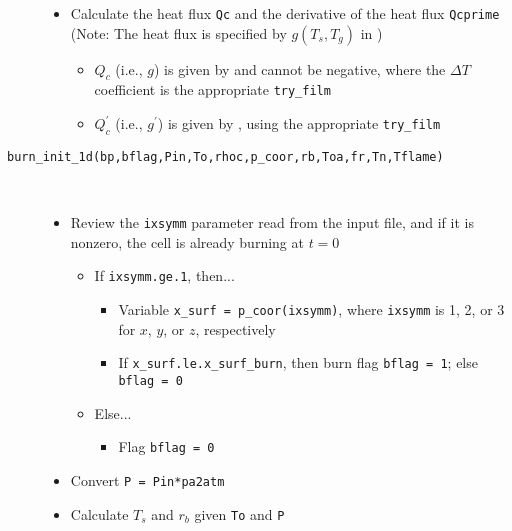 \begin{description}
{\begin{itemize}
\item{Calculate the heat flux \texttt{Qc} and the derivative of the heat flux \texttt{Qcprime} (Note: The heat flux is specified by $g(T_s,T_g)$ in )}
	\begin{itemize}
		\item{$Q_c$ (i.e., $g$) is given by  and cannot be negative, where the $\Delta T$ coefficient is the appropriate \texttt{try\_film}}
		\item{$Q_c^\prime$ (i.e., $g^\prime$) is given by , using the appropriate \texttt{try\_film}}
	\end{itemize}

\end{itemize}
}

\item[\texttt{burn\_init\_1d(bp,bflag,Pin,To,rhoc,p\_coor,rb,Toa,fr,Tn,Tflame)}]{\hfill \\ \vspace{-15pt}
\begin{itemize}
\item{Review the \texttt{ixsymm} parameter read from the input file, and if it is nonzero, the cell is already burning at $t=0$}

	\begin{itemize}

	\item{If \texttt{ixsymm.ge.1}, then...}
		\begin{itemize}
			\item{Variable \texttt{x\_surf = p\_coor(ixsymm)}, where \texttt{ixsymm} is 1, 2, or 3 for $x$, $y$, or $z$, respectively}
			\item{If \texttt{x\_surf.le.x\_surf\_burn}, then burn flag \texttt{bflag = 1}; else \texttt{bflag = 0}}
		\end{itemize}

	\item{Else...}
		\begin{itemize}
			\item{Flag \texttt{bflag = 0}}
		\end{itemize}

	\end{itemize}
	
\item{Convert \texttt{P = Pin*pa2atm}}
\item{Calculate $T_s$ and $r_b$ given \texttt{To} and \texttt{P}}

	\begin{itemize}


\end{itemize}
\end{itemize}}
\end{description}
